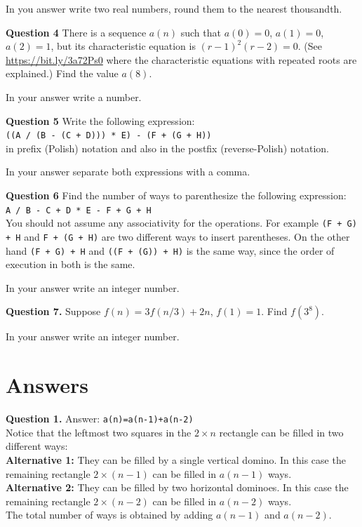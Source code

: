 \documentclass[jou]{apa6}
\begin{document}
In you answer write two real numbers, round them to the nearest thousandth.


\vspace{10pt}
{\bf Question 4}
There is a sequence $a(n)$ such that $a(0) = 0$, $a(1) = 0$, $a(2)=1$, but its
characteristic equation is $(r-1)^2(r-2) = 0$. (See \url{https://bit.ly/3a72Ps0} where
the characteristic equations with repeated roots are explained.)
Find the value $a(8)$.

In your answer write a number. 


\vspace{10pt}
{\bf Question 5} 
Write the following expression:\\
{\tt ((A / (B - (C + D))) * E) - (F + (G + H))}\\
in prefix (Polish) notation and also in the postfix (reverse-Polish) notation. 

In your answer separate both expressions with a comma.



\vspace{10pt}
{\bf Question 6} 
Find the number of ways to parenthesize the following expression:\\
{\tt A / B - C + D * E - F + G + H}\\
You should not assume any associativity for the operations.
For example {\tt (F + G) + H} and {\tt F + (G + H)} are two 
different ways to insert parentheses. On the other hand
{\tt (F + G) + H} and {\tt ((F + (G)) + H)} is the same way, since 
the order of execution in both is the same.

In your answer write an integer number.


\vspace{10pt}
{\bf Question 7.} 
Suppose $f(n) = 3f(n/3) + 2n$, $f(1) = 1$. Find $f(3^8)$.

In your answer write an integer number.

\newpage

\section{Answers}

\vspace{4pt}
{\bf Question 1.} Answer: {\tt a(n)=a(n-1)+a(n-2)}\\
Notice that the leftmost two squares in the $2 \times n$ 
rectangle can be filled in two different ways:\\
{\bf Alternative 1:} They can be filled by a single vertical domino. 
In this case the remaining rectangle $2 \times (n-1)$ can be 
filled in $a(n-1)$ ways.\\
{\bf Alternative 2:} They can be filled by two horizontal dominoes.
In this case the remaining rectangle $2 \times (n-2)$ can be filled
in $a(n-2)$ ways.\\
The total number of ways is obtained by adding $a(n-1)$ and $a(n-2)$.
\end{document}
